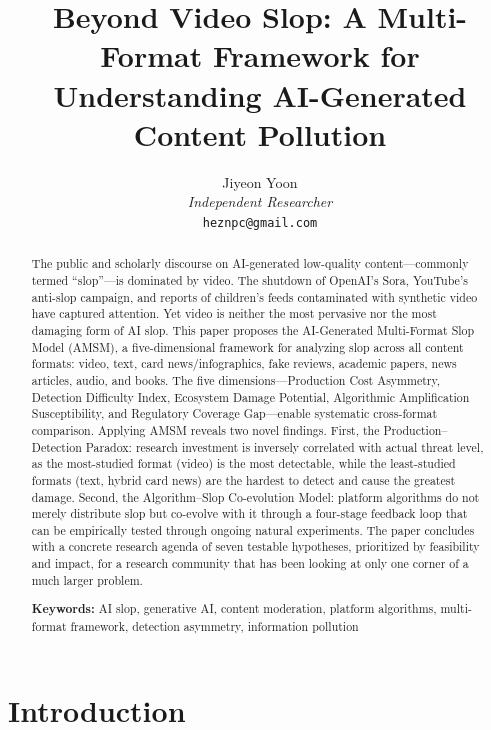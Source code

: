 \documentclass[12pt,a4paper]{article}
\title{\textbf{Beyond Video Slop: A Multi-Format Framework for Understanding AI-Generated Content Pollution}}
\author{%
  Jiyeon Yoon\\
  \textit{Independent Researcher}\\
  \texttt{heznpc@gmail.com}%
}
\date{}
\begin{document}
\maketitle

\begin{abstract}
\noindent
The public and scholarly discourse on AI-generated low-quality content---commonly termed ``slop''---is dominated by video. The shutdown of OpenAI's Sora, YouTube's anti-slop campaign, and reports of children's feeds contaminated with synthetic video have captured attention. Yet video is neither the most pervasive nor the most damaging form of AI slop. This paper proposes the AI-Generated Multi-Format Slop Model (AMSM), a five-dimensional framework for analyzing slop across all content formats: video, text, card news/infographics, fake reviews, academic papers, news articles, audio, and books. The five dimensions---Production Cost Asymmetry, Detection Difficulty Index, Ecosystem Damage Potential, Algorithmic Amplification Susceptibility, and Regulatory Coverage Gap---enable systematic cross-format comparison. Applying AMSM reveals two novel findings. First, the Production--Detection Paradox: research investment is inversely correlated with actual threat level, as the most-studied format (video) is the most detectable, while the least-studied formats (text, hybrid card news) are the hardest to detect and cause the greatest damage. Second, the Algorithm--Slop Co-evolution Model: platform algorithms do not merely distribute slop but co-evolve with it through a four-stage feedback loop that can be empirically tested through ongoing natural experiments. The paper concludes with a concrete research agenda of seven testable hypotheses, prioritized by feasibility and impact, for a research community that has been looking at only one corner of a much larger problem.

\medskip
\noindent\textbf{Keywords:} AI slop, generative AI, content moderation, platform algorithms, multi-format framework, detection asymmetry, information pollution
\end{abstract}

\newpage

\section{Introduction}
\end{document}
